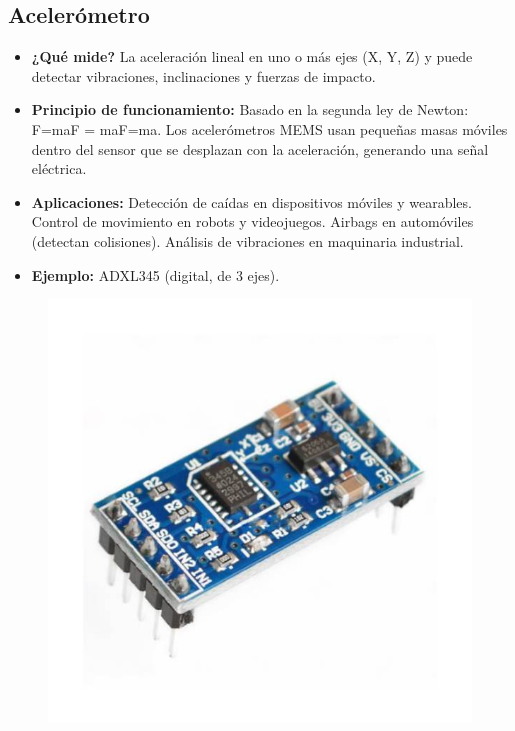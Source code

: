 \subsection*{Acelerómetro}
\begin{itemize}
	\item \textbf{¿Qué mide?} La aceleración lineal en uno o más ejes (X, Y, Z) y puede detectar vibraciones, inclinaciones y fuerzas de impacto.
	\item \textbf{Principio de funcionamiento:} Basado en la segunda ley de Newton: F=maF = maF=ma.
	Los acelerómetros MEMS usan pequeñas masas móviles dentro del sensor que se desplazan con la aceleración, generando una señal eléctrica.
	\item \textbf{Aplicaciones:} Detección de caídas en dispositivos móviles y wearables.
	Control de movimiento en robots y videojuegos.
	Airbags en automóviles (detectan colisiones).
	Análisis de vibraciones en maquinaria industrial.
	\item \textbf{Ejemplo:} ADXL345 (digital, de 3 ejes).
\end{itemize}
\begin{figure}[h]
	\centering
	\includegraphics[width=0.3\linewidth]{img/acelerometro}
	\label{fig:acelerometro}
\end{figure}

